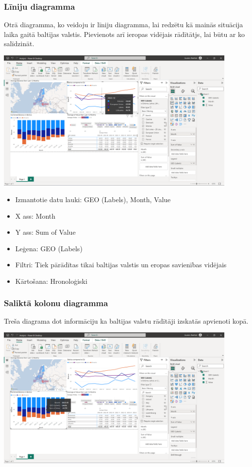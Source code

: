 \documentclass{article}
\begin{document}
\subsubsection{Līniju diagramma}
Otrā diagramma, ko veidoju ir līniju diagramma, lai redzētu kā mainās situācija laika gaitā baltījas valstis. Pievienots arī ieropas vidējais rādītātjs, lai būtu ar ko salīdzināt.

\includegraphics[width=0.9\textwidth, center]{Line}

\begin{itemize}
    \item Izmantotie datu lauki: GEO (Labels), Month, Value
    \item X ass: Month
    \item Y ass: Sum of Value
    \item Leģena: GEO (Labels)
    \item Filtri: Tiek pārādītas tikai baltijas valstis un eropas savienības vidējais
    \item Kārtošana: Hronoloģiski
\end{itemize}


\subsubsection{Saliktā kolonu diagramma}
Treša diagrama dot informāciju ka baltijas valstu rādītāji izskatās apvienoti kopā.

\includegraphics[width=0.9\textwidth, center]{Column}
\end{document}
